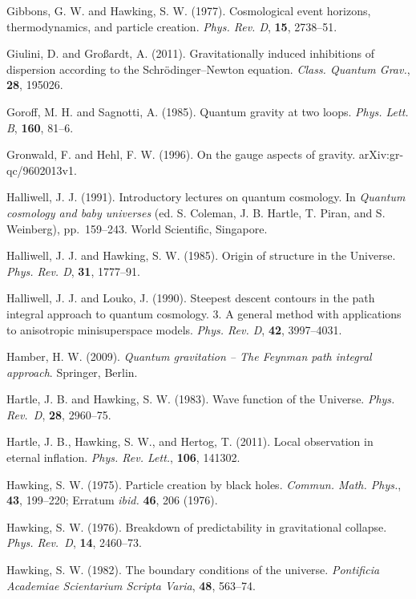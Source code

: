 \documentclass[12pt,a4paper]{article}
\begin{document}
\bibitem{} Gibbons, G. W. and Hawking, S. W. (1977).  Cosmological
  event horizons, thermodynamics, and particle creation. {\em
    Phys. Rev. D}, {\bf 15}, 2738--51. 

\bibitem{} Giulini, D. and Gro\ss ardt, A. (2011). 
          Gravitationally induced inhibitions of dispersion according
          to the Schr\"odinger--Newton equation. 
          {\em Class. Quantum Grav.}, {\bf 28}, 195026.

\bibitem{} Goroff, M. H. and Sagnotti, A. (1985). Quantum gravity at two loops.
           {\em Phys. Lett. B}, {\bf 160}, 81--6.

\bibitem{} Gronwald, F. and Hehl, F. W. (1996).  On the gauge aspects
           of gravity. arXiv:gr-qc/9602013v1. 

\bibitem{} Halliwell, J. J. (1991). Introductory lectures on quantum cosmology.
           In {\em Quantum cosmology and baby universes} (ed. S. Coleman,
           J. B. Hartle, T. Piran, and S. Weinberg), pp.~159--243.
           World Scientific, Singapore.

\bibitem{} Halliwell, J. J. and Hawking, S. W. (1985). 
           Origin of structure in the
           Universe. {\em Phys. Rev. D}, {\bf 31}, 1777--91.

\bibitem{} Halliwell, J. J. and Louko, J. (1990). 
           Steepest descent contours in the path integral approach 
    to quantum cosmology. 3. A general method with applications to anisotropic
    minisuperspace models. {\em Phys. Rev. D}, {\bf 42}, 3997--4031.


\bibitem{} Hamber, H. W. (2009). {\em Quantum gravitation -- The Feynman
       path integral approach}. Springer, Berlin.

\bibitem{} Hartle, J. B. and Hawking, S. W. (1983). Wave function of the
           Universe. {\em Phys. Rev.~D}, {\bf 28}, 2960--75.

\bibitem{} Hartle, J. B., Hawking, S. W., and Hertog, T. (2011).
 Local observation in eternal inflation. {\em Phys. Rev. Lett.}, {\bf
   106}, 141302.

\bibitem{} Hawking, S. W. (1975). Particle creation by black holes.
           {\em Commun. Math. Phys.}, {\bf 43}, 199--220; Erratum {\em
           ibid.} {\bf 46}, 206 (1976).

\bibitem{} Hawking, S. W. (1976). Breakdown of predictability in
  gravitational collapse. {\em Phys. Rev.~D}, {\bf 14}, 2460--73. 

\bibitem{} Hawking, S. W. (1982). The boundary conditions of the universe.
           {\em Pontificia Academiae Scientarium Scripta Varia},
           {\bf 48}, 563--74.
\end{document}
